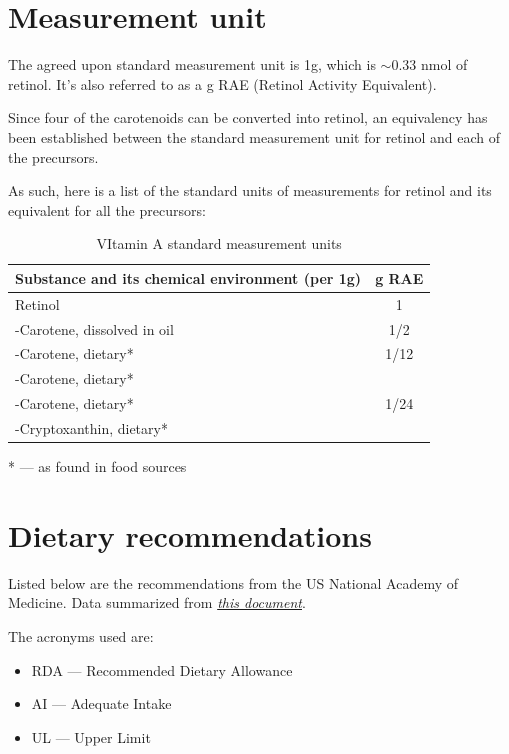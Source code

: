 \documentclass{book}
\begin{document}
\section{Measurement unit}
The agreed upon standard measurement unit is 1\textmu g, which is $\sim$0.33 nmol of retinol. It's also referred to as a \textmu g RAE (Retinol Activity Equivalent).

Since four of the carotenoids can be converted into retinol, an equivalency has been established between the standard measurement unit for retinol and each of the precursors.

As such, here is a list of the standard units of measurements for retinol and its equivalent for all the precursors:

\begin{table}[h]
	\caption{VItamin A standard measurement units}
	\centering \begin{tabular}{| l | c |}
		\hline
		\textbf{Substance and its chemical environment (per 1\textmu g)} & \textbf{\textmu g RAE}\\ \hline
		Retinol & 1\\ \hline
		\textbeta -Carotene, dissolved in oil & 1/2\\ \hline
		\textbeta -Carotene, dietary* & 1/12\\ \hline
		\textalpha -Carotene, dietary* &\\
		\textgamma -Carotene, dietary*& 1/24\\
		\textbeta -Cryptoxanthin, dietary* &\\ \hline
	\end{tabular}
\end{table}

* --- as found in food sources
\newpage

\section{Dietary recommendations}
Listed below are the recommendations from the US National Academy of Medicine. Data summarized from \href{https://nap.nationalacademies.org/read/10026/chapter/6}{\textit{this document}}.

The acronyms used are:
\begin{itemize}
	\item RDA --- Recommended Dietary Allowance
	\item AI --- Adequate Intake
	\item UL --- Upper Limit
\end{itemize}
\end{document}
